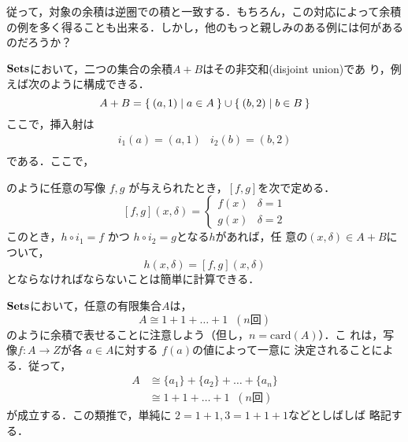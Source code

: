 従って，対象の余積は逆圏での積と一致する．もちろん，この対応によって余積
の例を多く得ることも出来る．しかし，他のもっと親しみのある例には何がある
のだろうか？

\begin{example}
 $\mathbf{Sets}$において，二つの集合の余積$A+B$はその非交和(disjoint union)であ
 り，例えば次のように構成できる．
 \[
  A + B = \Set{(a, 1) | a \in A} \cup \Set{(b, 2) | b \in B}
 \]
 ここで，挿入射は
 \[
  \begin{array}{ll}
   i_1(a) = (a, 1) & i_2(b) = (b, 2)\\
  \end{array}
 \]
 である．ここで，
\begin{center}
\end{center}
 のように任意の写像 $f, g$ が与えられたとき，$\left[f, g\right]$を次で定める．
 \[
  [f, g](x, \delta) =
 \begin{cases}
  f(x) & \delta = 1\\
  g(x) & \delta = 2
 \end{cases}
 \] %
 このとき，$h \circ i_1 = f$ かつ $h \circ i_2 = g$となる$h$があれば，任
 意の$(x, \delta) \in A + B$について，
 \[
 h(x, \delta) = [f,g](x, \delta)
 \]
 とならなければならないことは簡単に計算できる．
\end{example}
$\mathbf{Sets}$において，任意の有限集合$A$は，
\[
A \cong 1 + 1 + \dots + 1 \;\;(n \text{回})
\]
のように余積で表せることに注意しよう（但し，$n = \mathrm{card}(A)$）．こ
れは，写像$f: A \to Z$が各 $a \in A$に対する $f(a)$の値によって一意に
決定されることによる．従って，
\begin{align*}
 A &\cong \{a_1\} + \{a_2\} + \dots + \{a_n\}\\
   &\cong 1 + 1 + \dots + 1\;\;(n \text{回})
\end{align*}
が成立する．この類推で，単純に $2 = 1 + 1, 3 = 1 + 1 + 1$などとしばしば
略記する．

